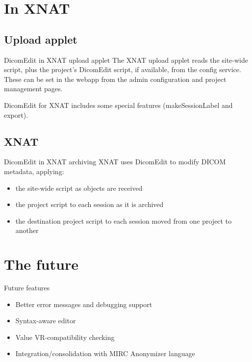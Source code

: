 \documentclass{beamer}  %
\begin{document}
\section{In XNAT}
\subsection{Upload applet}
\begin{frame}{DicomEdit in XNAT upload applet}
  The XNAT upload applet reads the site-wide script, plus the
  project's DicomEdit script, if available, from the config
  service. These can be set in the webapp from the admin configuration
  and project management pages.

DicomEdit for XNAT includes some special features (makeSessionLabel and export).
\end{frame}

\subsection{XNAT}
\begin{frame}{DicomEdit in XNAT archiving}
XNAT uses DicomEdit to modify DICOM metadata, applying:
\begin{itemize}
\pause \item the site-wide script as objects are received
\pause \item the project script to each session as it is archived
\pause \item the destination project script to each session moved
             from one project to another
\end{itemize}
\end{frame}

\section{The future}
\begin{frame}{Future features}
\begin{itemize}
\pause \item Better error messages and debugging support
\pause \item Syntax-aware editor
\pause \item Value VR-compatibility checking
\pause \item Integration/consolidation with MIRC Anonymizer language
\end{itemize}
\end{frame}
\end{document}
